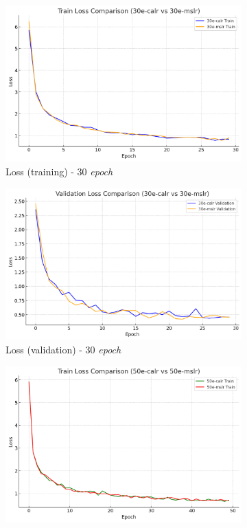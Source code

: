 \begin{figure}[htbp]
  \centering
  \begin{subfigure}{0.45\textwidth}
    \includegraphics[width=\textwidth]{gambar/bab4-train-loss-30e.png}
    \caption{Loss (training) - 30 \emph{epoch}}
  \end{subfigure}
  \hfill
  \begin{subfigure}{0.45\textwidth}
    \includegraphics[width=\textwidth]{gambar/bab4-val-loss-30e.png}
    \caption{Loss (validation) - 30 \emph{epoch}}
  \end{subfigure}
  \hfill
  \begin{subfigure}{0.45\textwidth}
    \includegraphics[width=\textwidth]{gambar/bab4-train-loss-50e.png}

\end{subfigure}
\end{figure}
